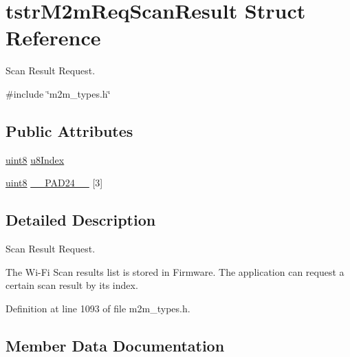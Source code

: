 \hypertarget{structtstrM2mReqScanResult}{}\section{tstr\+M2m\+Req\+Scan\+Result Struct Reference}
\label{structtstrM2mReqScanResult}


Scan Result Request.  




{\ttfamily \#include \char`\"{}m2m\+\_\+types.\+h\char`\"{}}

\subsection*{Public Attributes}
\begin{DoxyCompactItemize}
\item 
\hyperlink{group__DataT_ga4df709a77647e870bbf1d955b8edc9a6}{uint8} \hyperlink{structtstrM2mReqScanResult_a7f09d082424b29064faa67a51a633853}{u8\+Index}
\item 
\hyperlink{group__DataT_ga4df709a77647e870bbf1d955b8edc9a6}{uint8} \hyperlink{structtstrM2mReqScanResult_ac2d5aa05b0724a7bbee15ad40dc8656e}{\+\_\+\+\_\+\+P\+A\+D24\+\_\+\+\_\+} \mbox{[}3\mbox{]}
\end{DoxyCompactItemize}


\subsection{Detailed Description}
Scan Result Request. 

The Wi-\/\+Fi Scan results list is stored in Firmware. The application can request a certain scan result by its index. 

Definition at line 1093 of file m2m\+\_\+types.\+h.



\subsection{Member Data Documentation}
\mbox{\label{structtstrM2mReqScanResult_ac2d5aa05b0724a7bbee15ad40dc8656e}} 

